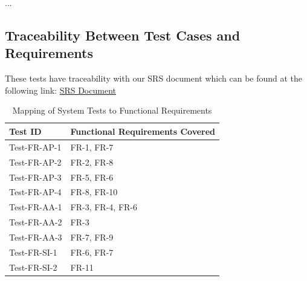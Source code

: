 \documentclass[12pt, titlepage]{article}
\begin{document}
...

\subsection{Traceability Between Test Cases and Requirements}
These tests have traceability with our SRS document which can be found at the following link: \href{https://github.com/VirochaanRG/MES-Event-Management-System/blob/main/docs/SRS/SRS.pdf}{SRS Document}
\begin{table}[H]
\centering
\begin{tabular}{|l|l|}
\hline
\textbf{Test ID} & \textbf{Functional Requirements Covered} \\
\hline
Test-FR-AP-1 & FR-1, FR-7 \\
Test-FR-AP-2 & FR-2, FR-8 \\
Test-FR-AP-3 & FR-5, FR-6 \\
Test-FR-AP-4 & FR-8, FR-10 \\
Test-FR-AA-1 & FR-3, FR-4, FR-6 \\
Test-FR-AA-2 & FR-3\\
Test-FR-AA-3 & FR-7, FR-9\\
Test-FR-SI-1 & FR-6, FR-7 \\
Test-FR-SI-2 & FR-11 \\
\hline
\end{tabular}
\caption{Mapping of System Tests to Functional Requirements}
\end{table}
\end{document}
